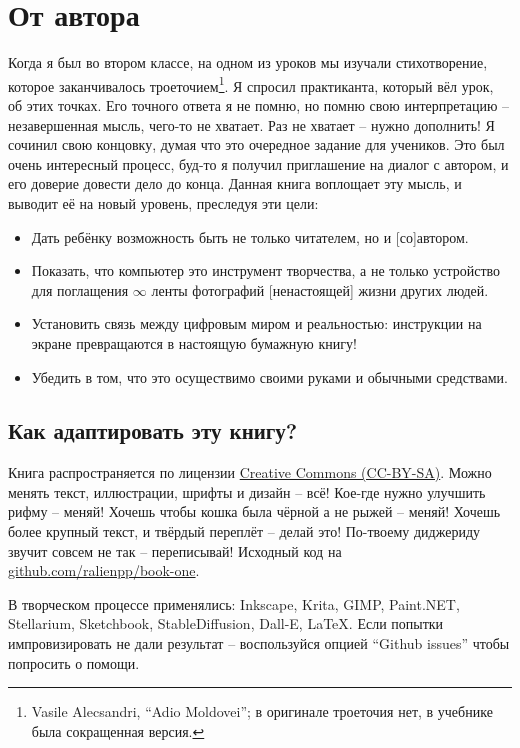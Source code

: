 \documentclass[a5paper,11pt]{memoir}
\begin{document}
\section*{От автора}
\footnotesize {
Когда я был во втором классе, на одном из уроков мы изучали стихотворение, которое заканчивалось троеточием\footnote{Vasile Alecsandri, ``Adio Moldovei''; в оригинале троеточия нет, в учебнике была сокращенная версия.}. Я спросил практиканта, который вёл урок, об этих точках. Его точного ответа я не помню, но помню свою интерпретацию -- незавершенная мысль, чего-то не хватает. Раз не хватает -- нужно дополнить! Я сочинил свою концовку, думая что это очередное задание для учеников. Это был очень интересный процесс, буд-то я получил приглашение на диалог с автором, и его доверие довести дело до конца. Данная книга воплощает эту мысль, и выводит её на новый уровень, преследуя эти цели:

\begin{itemize}
	\item Дать ребёнку возможность быть не только читателем, но и [со]автором.
	\item Показать, что компьютер это инструмент творчества, а не только устройство для поглащения  $\infty$ ленты фотографий [ненастоящей] жизни других людей.
	\item Установить связь между цифровым миром и реальностью: инструкции на экране превращаются в настоящую бумажную книгу!
	\item Убедить в том, что это осуществимо своими руками и обычными средствами.
\end{itemize}




\subsection{Как адаптировать эту книгу?}
Книга распространяется по лицензии \href{https://creativecommons.org/licenses/by-sa/4.0/}{Creative Commons (CC-BY-SA)}. Можно менять текст, иллюстрации, шрифты и дизайн -- всё! Кое-где нужно улучшить рифму -- меняй! Хочешь чтобы кошка была чёрной а не рыжей -- меняй! Хочешь более крупный текст, и твёрдый переплёт -- делай это! По-твоему диджериду звучит совсем не так -- переписывай! Исходный код на  \href{https://github.com/ralienpp/book-one}{github.com/ralienpp/book-one}.

В творческом процессе применялись: Inkscape, Krita, GIMP, Paint.NET, Stellarium, Sketchbook, StableDiffusion, Dall-E, \LaTeX. Если попытки импровизировать не дали результат -- воспользуйся опцией ``Github issues'' чтобы попросить о помощи.

}
\end{document}
